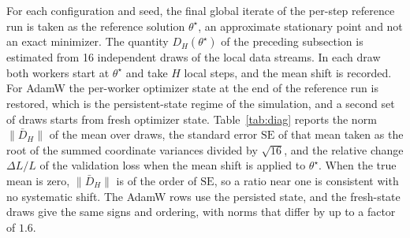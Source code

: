 \documentclass[11pt]{article}
\theoremstyle{definition}
\theoremstyle{remark}
\begin{document}
For each configuration and seed, the final global iterate of the per-step reference run is taken as the reference solution $\theta^\star$, an approximate stationary point and not an exact minimizer. The quantity $D_H(\theta^\star)$ of the preceding subsection is estimated from 16 independent draws of the local data streams. In each draw both workers start at $\theta^\star$ and take $H$ local steps, and the mean shift is recorded. For AdamW the per-worker optimizer state at the end of the reference run is restored, which is the persistent-state regime of the simulation, and a second set of draws starts from fresh optimizer state. Table~\ref{tab:diag} reports the norm $\|\bar D_H\|$ of the mean over draws, the standard error $\mathrm{SE}$ of that mean taken as the root of the summed coordinate variances divided by $\sqrt{16}$, and the relative change $\Delta L/L$ of the validation loss when the mean shift is applied to $\theta^\star$. When the true mean is zero, $\|\bar D_H\|$ is of the order of $\mathrm{SE}$, so a ratio near one is consistent with no systematic shift. The AdamW rows use the persisted state, and the fresh-state draws give the same signs and ordering, with norms that differ by up to a factor of $1.6$.
\end{document}
